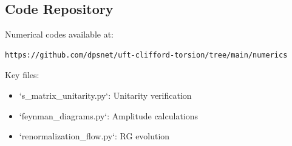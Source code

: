 \subsection{Code Repository}

Numerical codes available at:
\begin{verbatim}
https://github.com/dpsnet/uft-clifford-torsion/tree/main/numerics
\end{verbatim}

Key files:
\begin{itemize}
    \item `s_matrix_unitarity.py`: Unitarity verification
    \item `feynman_diagrams.py`: Amplitude calculations
    \item `renormalization_flow.py`: RG evolution
\end{itemize}
